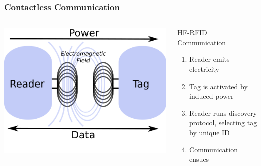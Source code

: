 \documentclass[unknownkeysallowed]{beamer}
\begin{document}
\begin{frame}
\frametitle{Contactless Communication}
  \begin{center}\begin{minipage}{.9\textwidth}
  \vspace{4mm}
  \begin{columns}[T]
    \begin{column}{.5\textwidth}
      \begin{block}{}
        \begin{center}
          \includegraphics[width=0.4\paperwidth]{figures/emitterAndTag.png}
        \end{center}
      \end{block}
    \end{column}
    \begin{column}{.5\textwidth}
      \vspace{4mm}
     \begin{block}{HF-RFID Communication}
		\begin{enumerate}
        \pause
		    \item{Reader emits electricity}
        \pause
		    \item{Tag is activated by induced power}
        \pause
      	\item{Reader runs discovery protocol, selecting tag by unique ID}
        \pause
      	\item{Communication ensues}
   		\end{enumerate}
    \end{block}
    \end{column}
  \end{columns}
  \end{minipage}\end{center}
\end{frame}
\end{document}
